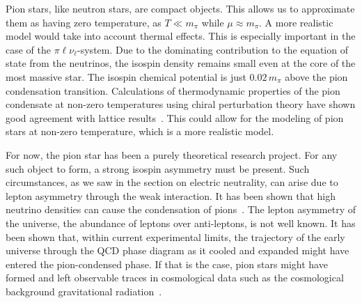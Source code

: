Pion stars, like neutron stars, are compact objects.
This allows us to approximate them as having zero temperature, as $T\ll m_\pi$ while $\mu \approx m_\pi$.
A more realistic model would take into account thermal effects.
This is especially important in the case of the $\pi\ell\nu_\ell$-system.
Due to the dominating contribution to the equation of state from the neutrinos, the isospin density remains small even at the core of the most massive star.
The isospin chemical potential is just $0.02\,m_\pi$ above the pion condensation transition.
Calculations of thermodynamic properties of the pion condensate at non-zero temperatures using chiral perturbation theory have shown good agreement with lattice results~\autocite{adhikariCondensatesPressureTwoflavor2021}.
This could allow for the modeling of pion stars at non-zero temperature, which is a more realistic model.


For now, the pion star has been a purely theoretical research project.
For any such object to form, a strong isospin asymmetry must be present.
Such circumstances, as we saw in the section on electric neutrality, can arise due to lepton asymmetry through the weak interaction.
It has been shown that high neutrino densities can cause the condensation of pions~\autocite{abukiPionCondensationDense2009}.
The lepton asymmetry of the universe, the abundance of leptons over anti-leptons, is not well known.
It has been shown that, within current experimental limits, the trajectory of the early universe through the QCD phase diagram as it cooled and expanded might have entered the pion-condensed phase.
If that is the case, pion stars might have formed and left observable traces in cosmological data such as the cosmological background gravitational radiation~\autocite{vovchenkoPionCondensationEarly2021,wygasCosmicQCDEpoch2018}.

